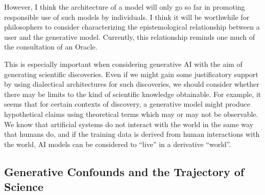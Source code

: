 \documentclass[11pt, oneside]{article}   	%
\begin{document}
However, I think the architecture of a model will only go so far in promoting responsible use of such models by individuals.  I think it will be worthwhile for philosophers to consider characterizing the epistemological relationship between a user and the generative model.  Currently, this relationship reminds  one much of the consultation of an Oracle.  



This is especially important when considering generative AI with the aim of generating scientific discoveries.  Even if we might gain some justificatory support by using dialectical architectures for such discoveries, we should consider whether there may be limits to the kind of scientific knowledge obtainable.  For example, it seems that for certain contexts of discovery, a generative model might produce hypothetical claims using theoretical terms which may or may not be observable.  We know that artificial systems do not interact with the world in the same way that humans do, and if the training data is derived from human interactions with the world, AI models can be considered to ``live'' in a derivative ``world''.








\subsection{Generative Confounds and the Trajectory of Science}

\end{document}
